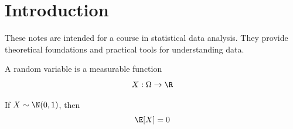 \chapter{Introduction}

These notes are intended for a course in statistical data analysis. They provide theoretical foundations and practical tools for understanding data.

\begin{definition}
A random variable is a measurable function
\[
X : \Omega \rightarrow \R
\]
\end{definition}

\begin{example}
If $X \sim \N(0,1)$, then
\[
\E[X] = 0
\]
\end{example}